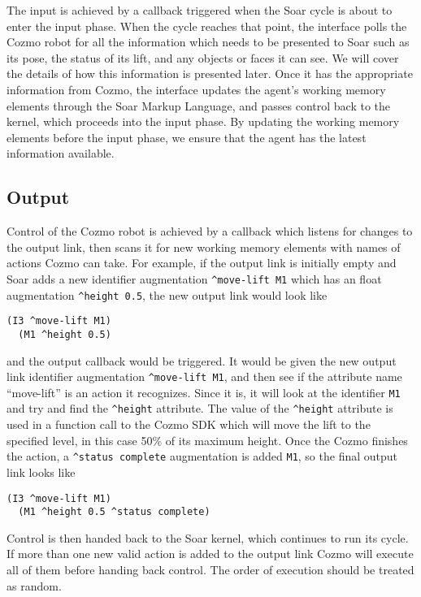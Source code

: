 The input is achieved by a callback triggered when the Soar cycle is
about to enter the input phase. When the cycle reaches that point, the
interface polls the Cozmo robot for all the information which needs to
be presented to Soar such as its pose, the status of its lift, and any
objects or faces it can see. We will cover the details of how this
information is presented later. Once it has the appropriate information
from Cozmo, the interface updates the agent's working memory elements
through the Soar Markup Language, and passes control back to the kernel,
which proceeds into the input phase. By updating the working memory
elements before the input phase, we ensure that the agent has the latest
information available.

\hypertarget{output}{%
\subsection{Output}\label{output}}

Control of the Cozmo robot is achieved by a callback which listens for
changes to the output link, then scans it for new working memory
elements with names of actions Cozmo can take. For example, if the
output link is initially empty and Soar adds a new identifier
augmentation \texttt{\^{}move-lift\ M1} which has an float augmentation
\texttt{\^{}height\ 0.5}, the new output link would look like

\begin{verbatim}
(I3 ^move-lift M1)
  (M1 ^height 0.5)
\end{verbatim}

and the output callback would be triggered. It would be given the new
output link identifier augmentation \texttt{\^{}move-lift\ M1}, and then
see if the attribute name ``move-lift'' is an action it recognizes.
Since it is, it will look at the identifier \texttt{M1} and try and find
the \texttt{\^{}height} attribute. The value of the \texttt{\^{}height}
attribute is used in a function call to the Cozmo SDK which will move
the lift to the specified level, in this case 50\% of its maximum
height. Once the Cozmo finishes the action, a
\texttt{\^{}status\ complete} augmentation is added \texttt{M1}, so the
final output link looks like

\begin{verbatim}
(I3 ^move-lift M1)
  (M1 ^height 0.5 ^status complete)
\end{verbatim}

Control is then handed back to the Soar kernel, which continues to run
its cycle. If more than one new valid action is added to the output link
Cozmo will execute all of them before handing back control. The order of
execution should be treated as random.

